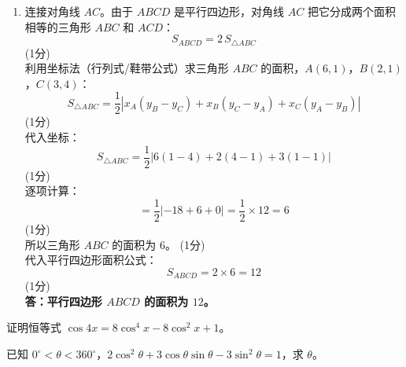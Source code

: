 \documentclass[12pt,a4paper]{exam-zh}
\newcommand{\qscore}[1]{%
    \unskip\nobreak\hfill
    \makebox[0pt][l]{\makebox[4em][r]{(#1\%)}}%
}
\begin{document}
\begin{solution}
\begin{enumerate}[label=(\alph*)]
        \item
            连接对角线 $AC$。由于 $ABCD$ 是平行四边形，对角线 $AC$ 把它分成两个面积相等的三角形 $ABC$ 和 $ACD$： \\
    $$S_{ABCD} = 2 \, S_{\triangle ABC}$$ \hfill (1分) \\
    利用坐标法（行列式/鞋带公式）求三角形 $ABC$ 的面积，$A(6,1)$，$B(2,1)$，$C(3,4)$： \\
    $$S_{\triangle ABC} = \frac{1}{2} \left| x_A(y_B - y_C) + x_B(y_C - y_A) + x_C(y_A - y_B) \right|$$ \hfill (1分) \\
    代入坐标： \\
    $$S_{\triangle ABC} = \frac{1}{2} \left| 6(1-4) + 2(4-1) + 3(1-1) \right|$$ \hfill (1分) \\
    逐项计算： \\
    $$= \frac{1}{2} \left| -18 + 6 + 0 \right| = \frac{1}{2} \times 12 = 6$$ \hfill (1分) \\
    所以三角形 $ABC$ 的面积为 $6$。 \hfill (1分) \\
    代入平行四边形面积公式： \\
    $$S_{ABCD} = 2 \times 6 = 12$$ \hfill (1分) \\
    \textbf{答：平行四边形 $ABCD$ 的面积为 $12$。}
    \end{enumerate}
\end{solution}

\begin{question}[points = 12]
    \begin{questionparts}
        \item 证明恒等式 $\cos 4x = 8\cos^{4}x - 8\cos^{2}x + 1$。 \qscore{5}

        \item 已知 $0^{\circ} < \theta < 360^{\circ}$，$\displaystyle 2\cos^{2}\theta + 3\cos\theta\sin\theta - 3\sin^{2}\theta = 1$，求 $\theta$。 \qscore{5}
    \end{questionparts}
\end{question}
\end{document}
